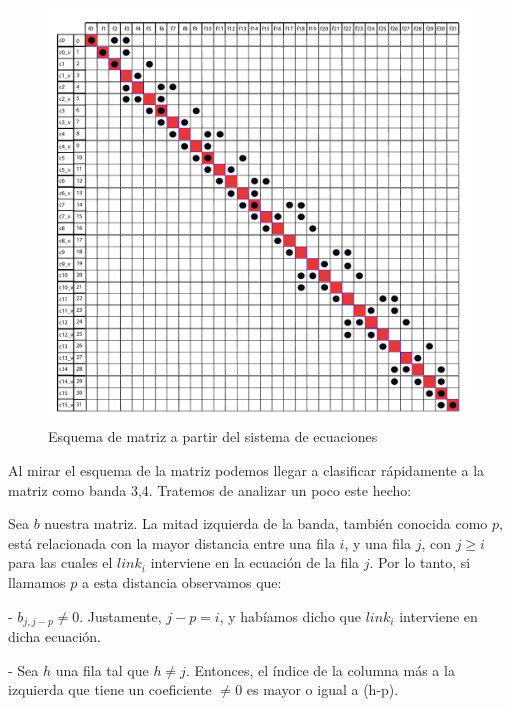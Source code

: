 \begin{figure}[!h]
	\begin{center}
		  \includegraphics[scale=0.5]{Imagenes/im_2.pdf}
		  \caption{Esquema de matriz a partir del sistema de ecuaciones}
		  \label{fig:contra1}
	\end{center}
\end{figure}
\FloatBarrier

Al mirar el esquema de la matriz podemos llegar a clasificar rápidamente a la matriz como banda 3,4. Tratemos de analizar un poco este hecho:

Sea $b$ nuestra matriz. 
La mitad izquierda de la banda, también conocida como $p$, está relacionada con la mayor distancia entre una fila $i$, y una fila $j$, con $j \geq i$ para 
las cuales el $link_{i}$ interviene en la ecuación de la fila $j$. Por lo tanto, si llamamos $p$ a esta distancia observamos que:

- $b_{j,j-p} \neq 0$. Justamente, $j-p = i$, y habíamos dicho que $link_{i}$ interviene en dicha ecuación.

- Sea $h$ una fila tal que $h \neq j$. Entonces, el índice de la columna más a la izquierda que tiene un coeficiente $\neq 0$ es mayor o igual a (h-p).

